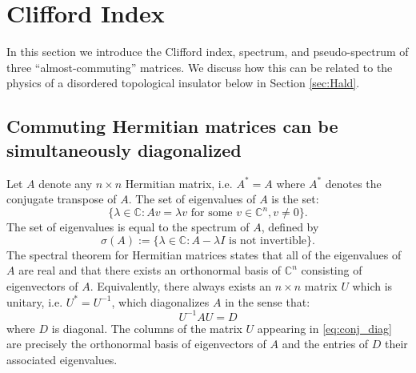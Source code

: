 \documentclass[a4paper]{article}
\begin{document}
\section{Clifford Index} \label{sec:Cliff_ind}	 

In this section we introduce the Clifford index, spectrum, and pseudo-spectrum of three ``almost-commuting'' matrices. We discuss how this can be related to the physics of a disordered topological insulator below in Section \ref{sec:Hald}.

\subsection{Commuting Hermitian matrices can be simultaneously diagonalized} \label{sec:Cliff_ind_comm}

Let $A$ denote any $n \times n$ {Hermitian} matrix, i.e. $A^* = A$ where $A^*$ denotes the conjugate transpose of $A$. The set of {eigenvalues} of $A$ is the set:
\begin{equation}
	\{ \lambda \in \mathbb{C} : A v = \lambda v \text{ for some $v \in \mathbb{C}^n, v \neq 0$}\}.
\end{equation}
The set of eigenvalues is equal to the spectrum of $A$, defined by
\begin{equation}
	\sigma(A) := \{\lambda \in \mathbb{C} : A - \lambda I \text{ is not invertible}\}.
\end{equation}
The spectral theorem for Hermitian matrices \cite{HoffmanKunze} states that all of the eigenvalues of $A$ are real and that there exists an orthonormal basis of $\mathbb{C}^n$ consisting of eigenvectors of $A$. Equivalently, there always exists an $n \times n$ matrix $U$ which is unitary, i.e. $U^* = U^{-1}$, which diagonalizes $A$ in the sense that:
\begin{equation} \label{eq:conj_diag}
	U^{-1} A U = D
\end{equation}
where $D$ is diagonal. The columns of the matrix $U$ appearing in \eqref{eq:conj_diag} are precisely the orthonormal basis of eigenvectors of $A$ and the entries of $D$ their associated eigenvalues.
\end{document}
